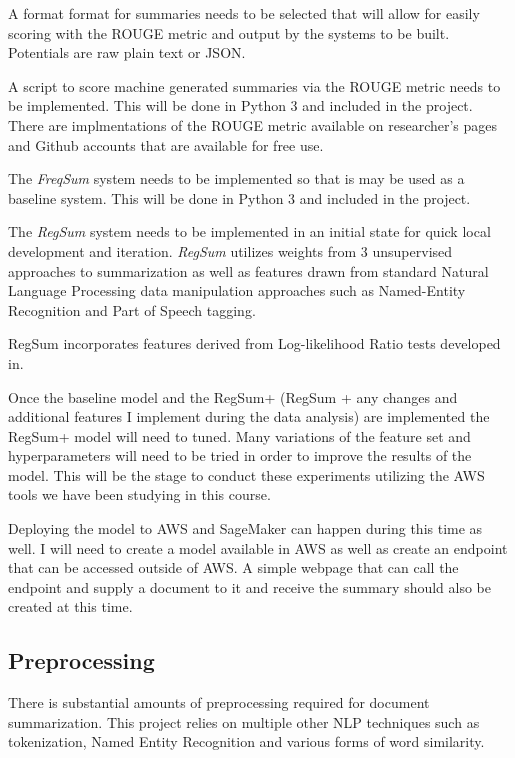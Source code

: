 \documentclass{article}
\begin{document}
A format format for summaries needs to be selected that will allow for easily
scoring with the ROUGE metric and output by the systems to be built. Potentials
are raw plain text or JSON\@.

A script to score machine generated summaries via the ROUGE metric needs to be
implemented. This will be done in Python 3 and included in the project.
There are implmentations of the ROUGE metric available on researcher's pages
and Github accounts that are available for free use.

The \emph{FreqSum} system needs to be implemented so that is may be used as
a baseline system. This will be done in Python 3 and included in the project.

The \emph{RegSum}\cite{RegSum} system needs to be implemented in an initial state for quick local
development and iteration. \emph{RegSum} utilizes weights from 3 unsupervised
approaches to summarization as well as features drawn from standard Natural
Language Processing data manipulation approaches such as Named-Entity
Recognition and Part of Speech tagging.

RegSum incorporates features derived from Log-likelihood Ratio tests developed
in\cite{TPSIG}.

Once the baseline model and the RegSum+ (RegSum + any changes and additional
features I implement during the data analysis) are implemented the RegSum+ model
will need to tuned. Many variations of the feature set and hyperparameters will
need to be tried in order to improve the results of the model. This will be the
stage to conduct these experiments utilizing the AWS tools we have been
studying in this course.

Deploying the model to AWS and SageMaker can happen during this time as well.
I will need to create a model available in AWS as well as create an endpoint
that can be accessed outside of AWS\@. A simple webpage that can call the endpoint
and supply a document to it and receive the summary should also be created at
this time.

\subsection{Preprocessing}
There is substantial amounts of preprocessing required for document
summarization. This project relies on multiple other NLP techniques such as
tokenization, Named Entity Recognition and various forms of word similarity.
\end{document}
